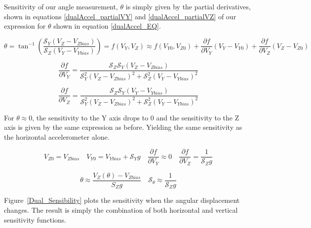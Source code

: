 \documentclass{article}
\theoremstyle{plain}
\theoremstyle{definition}
\theoremstyle{remark}
\newcommand{\Sens}{\mathcal{S}}
\begin{document}
Sensitivity of our angle measurement, $\theta$ is simply given by the partial derivatives, shown in equations \ref{dualAccel_partialVY} and \ref{dualAccel_partialVZ} of our expression for $\theta$ shown in equation \ref{dualAccel_EQ}.

\begin{equation}
\theta = \tan^{-1} \left( \frac{\Sens_{Y} \left( V_{Z} - V_{Zbias}\right)}{\Sens_{Z} \left( V_{Y} - V_{Ybias}\right)} \right) = f(V_{Y},V_{Z}) \approx f(V_{Y0},V_{Z0}) + \frac{\partial f}{\partial V_{Y}} \left( V_Y - V_{Y0} \right) + \frac{\partial f}{\partial V_Z} \left( V_Z - V_{Z0}\right)  
\label{dualAccel_EQ}
\end{equation}

\begin{equation}
\frac{\partial f}{\partial V_{Y}} = \frac{\Sens_Z \Sens_Y \left(V_{Z} - V_{Zbias} \right)}{\Sens^2_Y \left(V_Z - V_{Zbias} \right) ^2 + \Sens^2_Z \left( V_Y - V_{Ybias}\right)^2}
\label{dualAccel_partialVY}
\end{equation}

\begin{equation}
\frac{\partial f }{\partial V_Z} = \frac{\Sens_Z \Sens_Y \left(V_{Y} - V_{Ybias} \right)}{\Sens^2_Y \left(V_Z - V_{Zbias} \right) ^2 + \Sens^2_Z \left( V_Y - V_{Ybias}\right)^2}
\label{dualAccel_partialVZ}
\end{equation}

For $\theta \approx 0$, the sensitivity to the Y axis drops to 0 and the sensitivity to the Z axis is given by the same expression as before. 
Yielding the same sensitivity as the horizontal accelerometer alone.

$$ V_{Z0} = V_{Zbias}  \quad  V_{Y0} = V_{Ybias} + \Sens_{Y} g  \quad \frac{\partial f}{\partial V_{Y}} \approx 0  \quad \frac{\partial f }{\partial V_Z} = \frac{1}{\Sens_{Z} g}$$

$$ \theta \approx \frac{V_{Z}(\theta) - V_{Zbias}}{S_Z g}  \quad \Sens_\theta \approx \frac{1}{\Sens_Z g}$$

Figure~\ref{Dual_Sensibility} plots the sensitivity when the angular displacement changes. The result is simply the combination of both horizontal and vertical sensitivity functions. 
\end{document}

